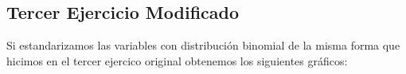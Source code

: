 \documentclass[a4paper]{article}
\begin{document}
	\subsection{Tercer Ejercicio Modificado}
	
	Si estandarizamos las variables con distribuci\'on binomial de la misma forma que hicimos en el tercer ejercico original obtenemos los siguientes gr\'aficos:
	
	\begin{figure}[H]
		\centering
		\hfill
	\end{figure}
	
\end{document}
